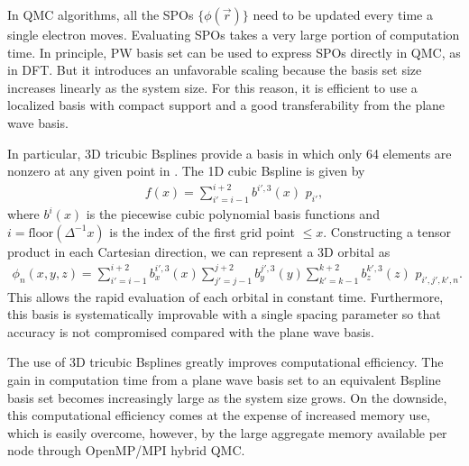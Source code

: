 \documentclass[letterpaper,10pt,english]{sphinxmanual}
\begin{document}
In QMC algorithms, all the SPOs \(\{\phi(\vec{r})\}\) need to be updated
every time a single electron moves. Evaluating SPOs takes a very large portion of computation time.
In principle, PW basis set can be used to express SPOs directly in QMC, as in DFT.
But it introduces an unfavorable scaling because the basis set size increases linearly as the system size.
For this reason, it is efficient to use a localized basis with compact
support and a good transferability from the plane wave basis.

In particular, 3D tricubic B\sphinxhyphen{}splines provide a basis in which only
64 elements are nonzero at any given point in .
The 1D cubic B\sphinxhyphen{}spline is given by
\begin{equation}\label{equation:intro_wavefunction:eq3}
\begin{split}f(x) = \sum_{i'=i-1}^{i+2} b^{i'\!,3}(x)\,\,  p_{i'},\end{split}
\end{equation}
where \(b^{i}(x)\) is the piecewise cubic polynomial basis functions
and \(i = \text{floor}(\Delta^{-1} x)\) is the index of the first
grid point \(\le x\). Constructing a tensor product in each
Cartesian direction, we can represent a 3D orbital as
\begin{equation}\label{equation:intro_wavefunction:eq4}
\begin{split}\phi_n(x,y,z) =
    \!\!\!\!\sum_{i'=i-1}^{i+2} \!\! b_x^{i'\!,3}(x)
    \!\!\!\!\sum_{j'=j-1}^{j+2} \!\! b_y^{j'\!,3}(y)
    \!\!\!\!\sum_{k'=k-1}^{k+2} \!\! b_z^{k'\!,3}(z) \,\, p_{i', j', k',n}.\end{split}
\end{equation}
This allows the rapid evaluation of each orbital in constant time.
Furthermore, this basis is systematically improvable with a single spacing
parameter so that accuracy is not compromised compared with the plane wave basis.

The use of 3D tricubic B\sphinxhyphen{}splines greatly improves computational efficiency.
The gain in computation time from a plane wave basis set to an equivalent B\sphinxhyphen{}spline basis set
becomes increasingly large as the system size grows.
On the downside, this computational efficiency comes at
the expense of increased memory use, which is easily overcome, however, by the large
aggregate memory available per node through OpenMP/MPI hybrid QMC.
\end{document}
